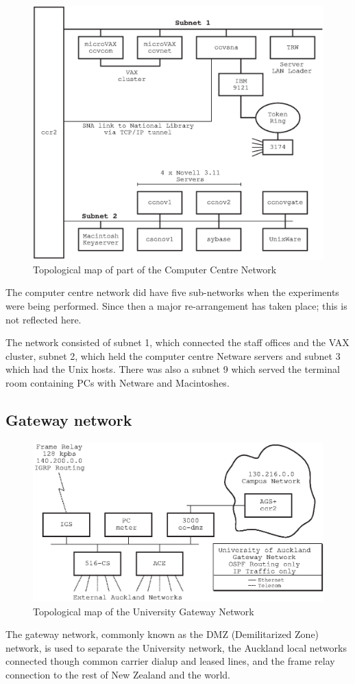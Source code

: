 \begin{figure}
\includegraphics{pics/subnets-1-2-map.eps}
\caption{Topological map of part of the Computer Centre Network}
\label{map:ccnet}
\end{figure}

The computer centre network did have five sub-networks when the
experiments were being performed.  Since then a major re-arrangement
has taken place; this is not reflected here.

The network consisted of subnet 1, which connected the staff offices
and the VAX cluster, subnet 2, which held the computer centre Netware
servers and subnet 3 which had the Unix hosts.  There was also a
subnet 9 which served the terminal room containing PCs with Netware
and Macintoshes.

\subsection{Gateway network}

\begin{figure}
\includegraphics{pics/gateway-net-map.eps}
\caption{Topological map of the University Gateway Network}
\label{map:dmz}
\end{figure}

The gateway network, commonly known as the DMZ (Demilitarized Zone)
network, is used to separate the University network, the Auckland
local networks connected though common carrier dialup and leased
lines, and the frame relay connection to the rest of New Zealand and
the world.
